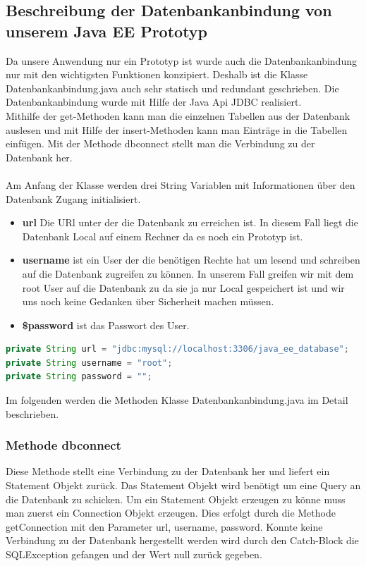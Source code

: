 \newpage

\subsection{Beschreibung der Datenbankanbindung von unserem Java EE Prototyp}

Da unsere Anwendung nur ein Prototyp ist wurde auch die Datenbankanbindung nur mit den wichtigsten Funktionen konzipiert. Deshalb ist die Klasse Datenbankanbindung.java auch sehr statisch und redundant geschrieben. 
Die Datenbankanbindung wurde mit Hilfe der Java Api JDBC realisiert.\\
Mithilfe der get-Methoden kann man die einzelnen Tabellen aus der Datenbank auslesen und mit Hilfe der insert-Methoden kann man Einträge in die Tabellen einfügen.
Mit der Methode dbconnect stellt man die Verbindung zu der Datenbank her.\\
\\
Am Anfang der Klasse werden drei String Variablen mit Informationen über den Datenbank Zugang initialisiert.
\begin{itemize}
	\item \textbf{url} Die URl unter der die Datenbank zu erreichen ist. In diesem Fall liegt die Datenbank Local auf einem Rechner da es noch ein Prototyp ist.
	\item \textbf{username} ist ein User der die benötigen Rechte hat um lesend und schreiben auf die Datenbank zugreifen zu können. In unserem Fall greifen wir mit dem root User auf die Datenbank zu da sie ja nur Local gespeichert ist und wir uns noch keine Gedanken über Sicherheit machen müssen.
	\item \textbf{\$password} ist das Passwort des User. 
\end{itemize}
\begin{lstlisting}[language=JAVA, caption=Datenbankanbindung.java/Datenfelder, firstnumber=30]
private String url = "jdbc:mysql://localhost:3306/java_ee_database";
private String username = "root";
private String password = "";
\end{lstlisting}
\newpage
Im folgenden werden die Methoden Klasse Datenbankanbindung.java im Detail beschrieben.
 
\subsubsection{Methode dbconnect\(\)}
Diese Methode stellt eine Verbindung zu der Datenbank her und liefert ein Statement Objekt zurück. Das Statement Objekt wird benötigt um eine Query an die Datenbank zu schicken.
Um ein Statement Objekt erzeugen zu könne muss man zuerst ein Connection Objekt erzeugen. Dies erfolgt durch die Methode getConnection mit den Parameter url, username, password. Konnte keine Verbindung zu der Datenbank hergestellt werden wird durch den Catch-Block die SQLException gefangen und der Wert null zurück gegeben.

